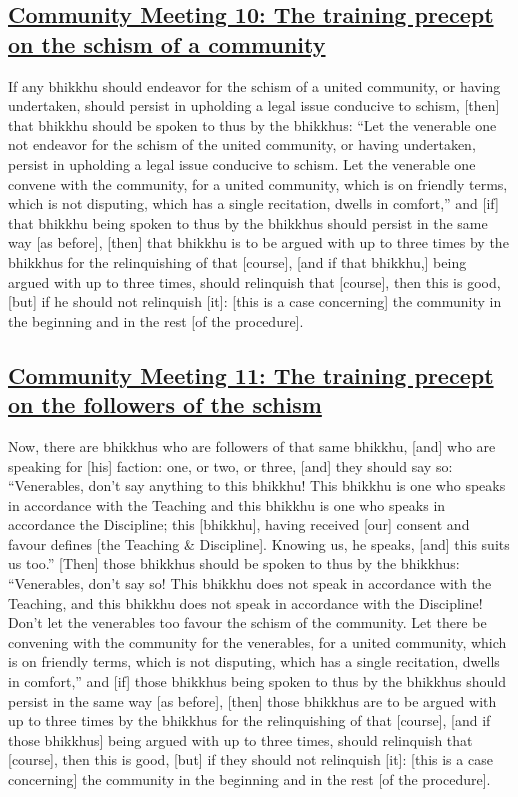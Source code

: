 \subsection*{\hyperref[sd10]{Community Meeting 10: The training precept on the schism of a community}}
\label{comm10}

If any bhikkhu should endeavor for the schism of a united community, or having undertaken, should persist in upholding a legal issue conducive to schism, [then] that bhikkhu should be spoken to thus by the bhikkhus: ``Let the venerable one not endeavor for the schism of the united community, or having undertaken, persist in upholding a legal issue conducive to schism. Let the venerable one convene with the community, for a united community, which is on friendly terms, which is not disputing, which has a single recitation, dwells in comfort,'' and [if] that bhikkhu being spoken to thus by the bhikkhus should persist in the same way [as before], [then] that bhikkhu is to be argued with up to three times by the bhikkhus for the relinquishing of that [course], [and if that bhikkhu,] being argued with up to three times, should relinquish that [course], then this is good, [but] if he should not relinquish [it]: [this is a case concerning] the community in the beginning and in the rest [of the procedure].



\subsection*{\hyperref[sd11]{Community Meeting 11: The training precept on the followers of the schism}}
\label{comm11}

Now, there are bhikkhus who are followers of that same bhikkhu, [and] who are speaking for [his] faction: one, or two, or three, [and] they should say so: ``Venerables, don't say anything to this bhikkhu! This bhikkhu is one who speaks in accordance with the Teaching and this bhikkhu is one who speaks in accordance the Discipline; this [bhikkhu], having received [our] consent and favour defines [the Teaching \& Discipline]. Knowing us, he speaks, [and] this suits us too.'' [Then] those bhikkhus should be spoken to thus by the bhikkhus: ``Venerables, don't say so! This bhikkhu does not speak in accordance with the Teaching, and this bhikkhu does not speak in accordance with the Discipline! Don't let the venerables too favour the schism of the community. Let there be convening with the community for the venerables, for a united community, which is on friendly terms, which is not disputing, which has a single recitation, dwells in comfort,'' and [if] those bhikkhus being spoken to thus by the bhikkhus should persist in the same way [as before], [then] those bhikkhus are to be argued with up to three times by the bhikkhus for the relinquishing of that [course], [and if those bhikkhus] being argued with up to three times, should relinquish that [course], then this is good, [but] if they should not relinquish [it]: [this is a case concerning] the community in the beginning and in the rest [of the procedure].



